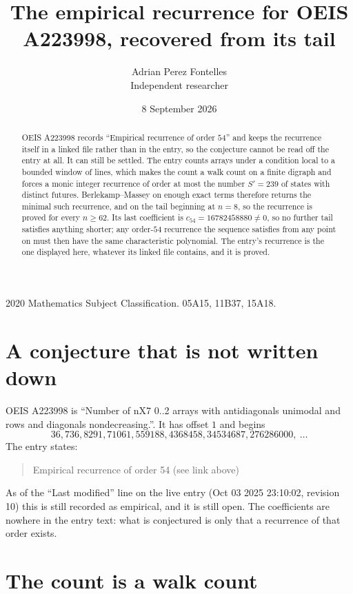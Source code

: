 \documentclass[11pt,a4paper]{article}
\title{The empirical recurrence for OEIS A223998, recovered from its tail}
\author{Adrian Perez Fontelles\\ \small Independent researcher}
\date{8 September 2026}
\theoremstyle{plain}
\theoremstyle{definition}
\begin{document}
\maketitle

\begin{abstract}
OEIS A223998 records ``Empirical recurrence of order $54$'' and keeps the recurrence itself in
a linked file rather than in the entry, so the conjecture cannot be read off the entry at all.
It can still be settled. The entry counts arrays under a condition local to a bounded window of
lines, which makes the count a walk count on a finite digraph and forces a monic integer
recurrence of order at most the number $S'=239$ of states with distinct futures. Berlekamp--Massey on
enough exact terms therefore returns the minimal such recurrence, and on the tail beginning at $n=8$, so the recurrence is proved for every $n\ge62$.
Its last coefficient is $c_{54}=16782458880\neq0$, so no further tail satisfies anything
shorter; any order-$54$ recurrence the sequence satisfies from any point on must then have
the same characteristic polynomial. The entry's recurrence is the one displayed here, whatever
its linked file contains, and it is proved.
\end{abstract}

\noindent\small 2020 Mathematics Subject Classification. 05A15, 11B37, 15A18.\normalsize

\section{A conjecture that is not written down}

OEIS A223998 is ``Number of nX7 0..2 arrays with antidiagonals unimodal and rows and diagonals nondecreasing.''. It has offset $1$ and begins
\[
36, 736, 8291, 71061, 559188, 4368458, 34534687, 276286000,\ \dots
\]
The entry states:
\begin{quote}
Empirical recurrence of order 54 (see link above)
\end{quote}
As of the ``Last modified'' line on the live entry (Oct 03 2025 23:10:02, revision 10)
this is still recorded as empirical, and it is still open. The coefficients are nowhere in the
entry text: what is conjectured is only that a recurrence of that order exists.

\section{The count is a walk count}
\end{document}
